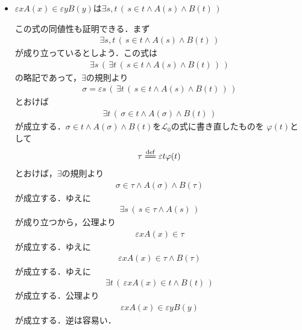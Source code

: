 \documentclass[a4j,10.5pt,oneside,openany]{jsbook}
\theoremstyle{mystyle}
\newcommand{\defeq}{\overset{\mathrm{def}}{=\joinrel=}} %
\begin{document}
\begin{itemize}
		\item $\varepsilon x A(x) \in \varepsilon y B(y)$は$\exists s,t\, \left(\, s \in t \wedge A(s) \wedge B(t)\, \right)$
		
			この式の同値性も証明できる．まず
			\begin{align}
				\exists s,t\, \left(\, s \in t \wedge A(s) \wedge B(t)\, \right)
			\end{align}
			が成り立っているとしよう．この式は
			\begin{align}
				\exists s\, \left(\, \exists t\, \left(\, s \in t \wedge A(s) \wedge B(t)\, \right)\, \right)
			\end{align}
			の略記であって，$\exists$の規則より
			\begin{align}
				\sigma = \varepsilon s\, \left(\, \exists t\, \left(\, s \in t \wedge A(s) \wedge B(t)\, \right)\, \right)
			\end{align}
			とおけば
			\begin{align}
				\exists t\, \left(\, \sigma \in t \wedge A(\sigma) \wedge B(t)\, \right)
			\end{align}
			が成立する．$\sigma \in t \wedge A(\sigma) \wedge B(t)$を$\mathcal{L}_{0}$の式に書き直したものを
			$\varphi(t)$として
			\begin{align}
				\tau \defeq \varepsilon t \varphi(t)
			\end{align}
			とおけば，$\exists$の規則より
			\begin{align}
				\sigma \in \tau \wedge A(\sigma) \wedge B(\tau)
			\end{align}
			が成立する．ゆえに
			\begin{align}
				\exists s\, \left(\, s \in \tau \wedge A(s)\, \right)
			\end{align}
			が成り立つから，公理より
			\begin{align}
				\varepsilon x A(x) \in \tau
			\end{align}
			が成立する．ゆえに
			\begin{align}
				\varepsilon x A(x) \in \tau \wedge B(\tau)
			\end{align}
			が成立する．ゆえに
			\begin{align}
				\exists t\, \left(\, \varepsilon x A(x) \in t \wedge B(t)\, \right)
			\end{align}
			が成立する．公理より
			\begin{align}
				\varepsilon x A(x) \in \varepsilon y B(y)
			\end{align}
			が成立する．逆は容易い．
			\begin{align}

\end{align}
\end{itemize}
\end{document}

